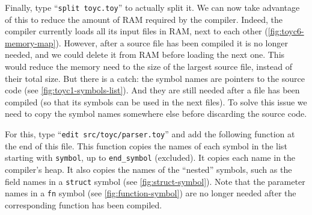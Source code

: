 Finally, type ``{\tt split toyc.toy}'' to actually split it. We can now take
advantage of this to reduce the amount of RAM required by the compiler. Indeed,
the compiler currently loads all its input files in RAM, next to each other
(\cref{fig:toyc6-memory-map}). However, after a source file has been compiled
it is no longer needed, and we could delete it from RAM before loading the next
one. This would reduce the memory need to the size of the largest source file,
instead of their total size. But there is a catch: the symbol names are
pointers to the source code (see \cref{fig:toyc1-symbols-list}). And they are
still needed after a file has been compiled (so that its symbols can be used in
the next files). To solve this issue we need to copy the symbol names somewhere
else before discarding the source code.

For this, type ``{\tt edit src/toyc/parser.toy}'' and add the following
function at the end of this file. This function copies the names of each symbol
in the list starting with {\tt symbol}, up to {\tt end\_symbol} (excluded). It
copies each name in the compiler's heap. It also copies the names of the
``nested'' symbols, such as the field names in a {\tt struct} symbol (see
\cref{fig:struct-symbol}). Note that the parameter names in a {\tt fn} symbol
(see \cref{fig:function-symbol}) are no longer needed after the corresponding
function has been compiled.




